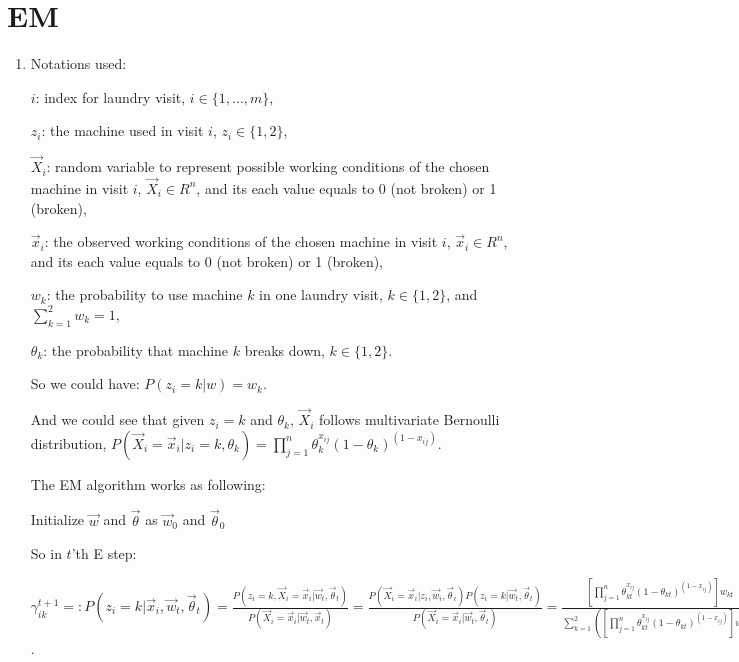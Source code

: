 \documentclass[paper=letter, fontsize=12pt]{article}
\begin{document}
\section{EM}
\begin{enumerate}[label=(\alph*)]
	\item Notations used:
	
	$i$: index for laundry visit, $i \in \{1, \dots, m\}$,
	
	$z_i$: the machine used in visit $i$, $z_i \in \{1, 2\}$,
	
	$\vec{X}_i$: random variable to represent possible working conditions of the chosen machine in visit $i$, $\vec{X}_i \in R^n$, and its each value equals to 0 (not broken) or 1 (broken),
	
	$\vec{x}_i$: the observed working conditions of the chosen machine in visit $i$, $\vec{x}_i \in R^n$, and its each value equals to 0 (not broken) or 1 (broken),
	
	$w_k$: the probability to use machine $k$ in one laundry visit, $k \in \{1, 2\}$, and $\sum_{k = 1}^{2} w_k = 1$,
	
	$\theta_k$: the probability that machine $k$ breaks down, $k \in \{1, 2\}$.
	
	So we could have: $P(z_i = k | w) = w_k$.
	
	And we could see that given $z_i = k$ and $\theta_{k}$, $\vec{X}_i$ follows multivariate Bernoulli distribution, $P(\vec{X}_i = \vec{x}_i | z_i = k, \theta_k) = \prod_{j = 1}^{n} \theta_k^{x_{ij}} (1-\theta_k)^{(1-x_{ij})}$.
	
	The EM algorithm works as following:
	
	\begin{algorithm}[H]
		Initialize $\vec{w}$ and $\vec{\theta}$ as $\vec{w}_0$ and $\vec{\theta}_0$\;
	\end{algorithm}
	
	So in $t$'th E step:
	
	$\gamma_{ik}^{t+1} =: P(z_i = k | \vec{x}_i, \vec{w}_t, \vec{\theta}_t) = \frac{P(z_i = k, \vec{X}_i = \vec{x}_i | \vec{w}_t, \vec{\theta}_t)}{P(\vec{X}_i = \vec{x}_i | \vec{w}_t, \vec{x}_t)} = \frac{P(\vec{X}_i = \vec{x}_i | z_i, \vec{w}_i, \vec{\theta}_i) P(z_i = k | \vec{w}_t, \vec{\theta}_t)}{P(\vec{X}_i = \vec{x}_i | \vec{w}_t, \vec{\theta}_t)} = \frac{[\prod_{j=1}^{n} \theta_{kt}^{x_{ij}} (1- \theta_{kt})^{(1-x_{ij})}] w_{kt}}{\sum_{k = 1}^{2}([\prod_{j=1}^{n} \theta_{kt}^{x_{ij}} (1- \theta_{kt})^{(1-x_{ij})}] w_{kt}) }$.
	

\end{enumerate}
\end{document}
